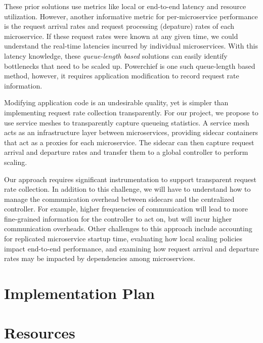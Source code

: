 \documentclass{proposal}
\begin{document}
These prior solutions use metrics like local or end-to-end latency and resource utilization. However, another informative metric for per-microservice performance is the request arrival rates and request processing (depature) rates of each microservice. If these request rates were known at any given time, we could understand the real-time latencies incurred by individual microservices. With this latency knowledge, these \textit{queue-length based} solutions can easily identify bottlenecks that need to be scaled up. Powerchief is one such queue-length based method, however, it requires application modification to record request rate information.

Modifying application code is an undesirable quality, yet is simpler than implementing request rate collection transparently. For our project, we propose to use service meshes to transparently capture queueing statistics. A service mesh acts as an infrastructure layer between microservices, providing sidecar containers that act as a proxies for each microservice. The sidecar can then capture request arrival and departure rates and transfer them to a global controller to perform scaling.

Our approach requires significant instrumentation to support transparent request rate collection. In addition to this challenge, we will have to understand how to manage the communication overhead between sidecars and the centralized controller. For example, higher frequencies of communication will lead to more fine-grained information for the controller to act on, but will incur higher communication overheads.
Other challenges to this approach include accounting for replicated microservice startup time, evaluating how local scaling policies impact end-to-end performance, and examining how request arrival and departure rates may be impacted by dependencies among microservices.

\section{Implementation Plan}

\section{Resources}
\end{document}
